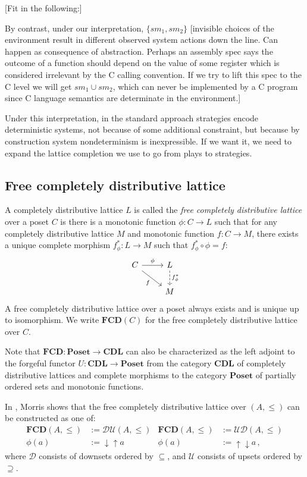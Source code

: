 \documentclass[format=sigplan,authordraft]{acmart}
\begin{document}
[Fit in the following:]

By contrast,
under our interpretation,
$\{ s m_1, s m_2 \}$
[invisible choices of the environment
result in different observed system actions down the line.
Can happen as consequence of abstraction.
Perhaps an assembly spec says
the outcome of a function should depend on the value of some
register which is considered irrelevant by the C calling convention.
If we try to lift this spec to the C level
we will get $s m_1 \cup s m_2$,
which can never be implemented by a C program
since C language semantics are determinate in the environment.]

Under this interpretation,
in the standard approach strategies encode deterministic systems,
not because of some additional constraint,
but because by construction system nondeterminism is inexpressible.
If we want it,
we need to expand the lattice completion we use
to go from plays to strategies.


\subsection{Free completely distributive lattice} \label{sec:fcd} %

A completely distributive lattice $L$ is called the
\emph{free completely distributive lattice}
over a poset $C$ is there is
a monotonic function $\phi : C \rightarrow L$
such that
for any completely distributive lattice $M$
and monotonic function $f : C \rightarrow M$,
there exists a unique complete morphism $f^*_\phi : L \rightarrow M$
such that $f^*_\phi \circ \phi = f$:
\[
  \begin{tikzcd}
    C \arrow[r, "\phi"] \arrow[rd, "f"'] &
    L \arrow[d, "f^*_\phi", dashed] \\ & M
  \end{tikzcd}
\]
A free completely distributive lattice over a poset
always exists and is unique up to isomorphism.
We write $\mathbf{FCD}(C)$ for
the free completely distributive lattice over $C$.

Note that $\mathbf{FCD} : \mathbf{Poset} \rightarrow \mathbf{CDL}$
can also be characterized as
the left adjoint to the forgeful functor
$U : \mathbf{CDL} \rightarrow \mathbf{Poset}$
from the category $\mathbf{CDL}$
of completely distributive lattices and complete morphisms
to the category $\mathbf{Poset}$
of partially ordered sets and monotonic functions.

In \cite{augtyp}, Morris shows that
the free completely distributive lattice over $(A, \le)$
can be constructed as one of:
\begin{align*}
  \mathbf{FCD}(A, {\le}) &:= \mathcal{D} \mathcal{U}(A, {\le}) &
  \mathbf{FCD}(A, {\le}) &:= \mathcal{U} \mathcal{D}(A, {\le}) \\
  \phi(a) &:= {\downarrow}{\uparrow} a &
  \phi(a) &:= {\uparrow}{\downarrow} a \,,
\end{align*}
where $\mathcal{D}$ consists of
downsets ordered by $\subseteq$,
and $\mathcal{U}$ consists of
upsets ordered by $\supseteq$.
\end{document}
